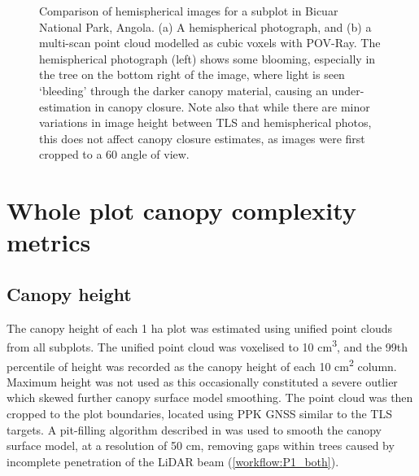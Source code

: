 \begin{refsection}
\begin{figure}
\begin{subfigure}{0.45\linewidth}
		\caption{}
		\label{workflow:hemi_tls}
	\end{subfigure}
	\caption[Comparison of hemispherical images generated from TLS and hemispherical photography]{Comparison of hemispherical images for a subplot in Bicuar National Park, Angola. (a) A hemispherical photograph, and (b) a multi-scan point cloud modelled as cubic voxels with POV-Ray. The hemispherical photograph (left) shows some blooming, especially in the tree on the bottom right of the image, where light is seen `bleeding' through the darker canopy material, causing an under-estimation in canopy closure. Note also that while there are minor variations in image height between TLS and hemispherical photos, this does not affect canopy closure estimates, as images were first cropped to a 60\textdegree{} angle of view.}
	\label{workflow:hemi_tls_ex}
\end{figure}

\section{Whole plot canopy complexity metrics}

\subsection{Canopy height}

The canopy height of each 1 ha plot was estimated using unified point clouds from all subplots. The unified point cloud was voxelised to 10 cm\textsuperscript{3}, and the 99th percentile of height was recorded as the canopy height of each 10 cm\textsuperscript{2} column. Maximum height was not used as this occasionally constituted a severe outlier which skewed further canopy surface model smoothing. The point cloud was then cropped to the plot boundaries, located using PPK GNSS similar to the TLS targets. A pit-filling algorithm described in \citet{Khosravipour2014} was used to smooth the canopy surface model, at a resolution of 50 cm, removing gaps within trees caused by incomplete penetration of the LiDAR beam (\autoref{workflow:P1_both}). 


\end{refsection}
